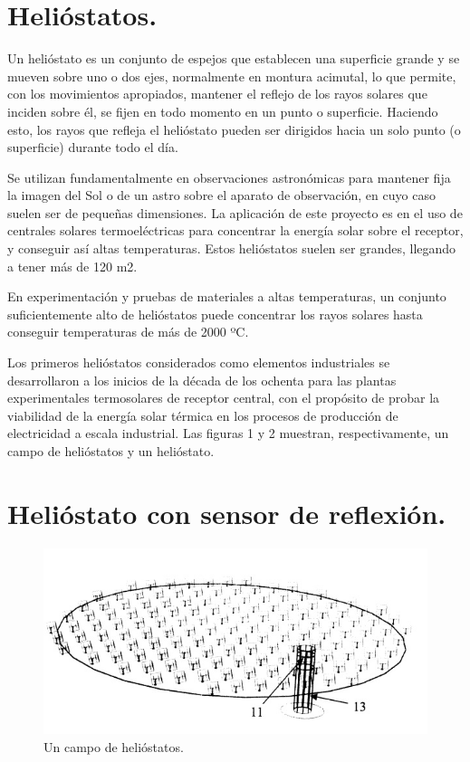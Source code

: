 \section{Helióstatos.}

Un helióstato es un conjunto de espejos que establecen una superficie grande y se mueven sobre uno o dos ejes, normalmente en montura acimutal, lo que permite, con los movimientos apropiados, mantener el reflejo de los rayos solares que inciden sobre él, se fijen en todo momento en un punto o superficie. Haciendo esto, los rayos que refleja el helióstato pueden ser dirigidos hacia un solo punto (o superficie) durante todo el día.

Se utilizan fundamentalmente en observaciones astronómicas para mantener fija la imagen del Sol o de un astro sobre el aparato de observación, en cuyo caso suelen ser de pequeñas dimensiones. La aplicación de este proyecto es en el uso de centrales solares termoeléctricas para concentrar la energía solar sobre el receptor, y conseguir así altas temperaturas. Estos helióstatos suelen ser grandes, llegando a tener más de 120 m2.

En experimentación y pruebas de materiales a altas temperaturas, un conjunto suficientemente alto de helióstatos puede concentrar los rayos solares hasta conseguir temperaturas de más de 2000 ºC.

Los primeros helióstatos considerados como elementos industriales se desarrollaron a los inicios de la década de los ochenta para las plantas experimentales termosolares de receptor central, con el propósito de probar la viabilidad de la energía solar térmica en los procesos de producción de electricidad a escala industrial. Las figuras 1 y 2 muestran, respectivamente, un campo de helióstatos y un helióstato.

\section{Helióstato con sensor de reflexión.}

\begin{figure}[h!]
  	\centering
	\includegraphics[scale=0.7]{FotosPaginasWebHeliostatos/unnamed(1).jpg}
	\caption{Un campo de helióstatos.~\cite{OepmWebSite} \label{fig:FotosPaginasWebHeliostatos/unnamed(1).jpg}}
\end{figure}


